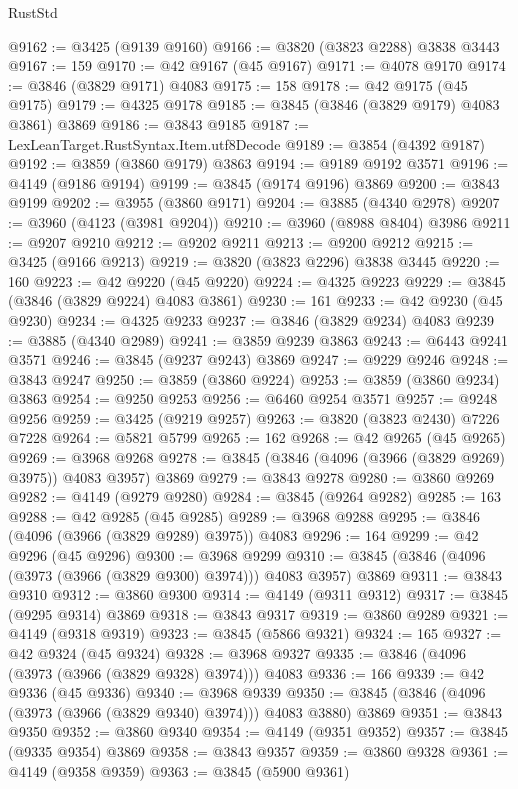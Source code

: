 \begin{lexlean}{RustStd}
\begin{coremodule}
@9162 := @3425 (@9139 @9160)
@9166 := @3820 (@3823 @2288) @3838 @3443
@9167 := 159
@9170 := @42 @9167 (@45 @9167)
@9171 := @4078 @9170
@9174 := @3846 (@3829 @9171) @4083
@9175 := 158
@9178 := @42 @9175 (@45 @9175)
@9179 := @4325 @9178
@9185 := @3845 (@3846 (@3829 @9179) @4083 @3861) @3869
@9186 := @3843 @9185
@9187 := LexLeanTarget.RustSyntax.Item.utf8Decode
@9189 := @3854 (@4392 @9187)
@9192 := @3859 (@3860 @9179) @3863
@9194 := @9189 @9192 @3571
@9196 := @4149 (@9186 @9194)
@9199 := @3845 (@9174 @9196) @3869
@9200 := @3843 @9199
@9202 := @3955 (@3860 @9171)
@9204 := @3885 (@4340 @2978)
@9207 := @3960 (@4123 (@3981 @9204))
@9210 := @3960 (@8988 @8404) @3986
@9211 := @9207 @9210
@9212 := @9202 @9211
@9213 := @9200 @9212
@9215 := @3425 (@9166 @9213)
@9219 := @3820 (@3823 @2296) @3838 @3445
@9220 := 160
@9223 := @42 @9220 (@45 @9220)
@9224 := @4325 @9223
@9229 := @3845 (@3846 (@3829 @9224) @4083 @3861)
@9230 := 161
@9233 := @42 @9230 (@45 @9230)
@9234 := @4325 @9233
@9237 := @3846 (@3829 @9234) @4083
@9239 := @3885 (@4340 @2989)
@9241 := @3859 @9239 @3863
@9243 := @6443 @9241 @3571
@9246 := @3845 (@9237 @9243) @3869
@9247 := @9229 @9246
@9248 := @3843 @9247
@9250 := @3859 (@3860 @9224)
@9253 := @3859 (@3860 @9234) @3863
@9254 := @9250 @9253
@9256 := @6460 @9254 @3571
@9257 := @9248 @9256
@9259 := @3425 (@9219 @9257)
@9263 := @3820 (@3823 @2430) @7226 @7228
@9264 := @5821 @5799
@9265 := 162
@9268 := @42 @9265 (@45 @9265)
@9269 := @3968 @9268
@9278 := @3845 (@3846 (@4096 (@3966 (@3829 @9269) @3975)) @4083 @3957) @3869
@9279 := @3843 @9278
@9280 := @3860 @9269
@9282 := @4149 (@9279 @9280)
@9284 := @3845 (@9264 @9282)
@9285 := 163
@9288 := @42 @9285 (@45 @9285)
@9289 := @3968 @9288
@9295 := @3846 (@4096 (@3966 (@3829 @9289) @3975)) @4083
@9296 := 164
@9299 := @42 @9296 (@45 @9296)
@9300 := @3968 @9299
@9310 := @3845 (@3846 (@4096 (@3973 (@3966 (@3829 @9300) @3974))) @4083 @3957) @3869
@9311 := @3843 @9310
@9312 := @3860 @9300
@9314 := @4149 (@9311 @9312)
@9317 := @3845 (@9295 @9314) @3869
@9318 := @3843 @9317
@9319 := @3860 @9289
@9321 := @4149 (@9318 @9319)
@9323 := @3845 (@5866 @9321)
@9324 := 165
@9327 := @42 @9324 (@45 @9324)
@9328 := @3968 @9327
@9335 := @3846 (@4096 (@3973 (@3966 (@3829 @9328) @3974))) @4083
@9336 := 166
@9339 := @42 @9336 (@45 @9336)
@9340 := @3968 @9339
@9350 := @3845 (@3846 (@4096 (@3973 (@3966 (@3829 @9340) @3974))) @4083 @3880) @3869
@9351 := @3843 @9350
@9352 := @3860 @9340
@9354 := @4149 (@9351 @9352)
@9357 := @3845 (@9335 @9354) @3869
@9358 := @3843 @9357
@9359 := @3860 @9328
@9361 := @4149 (@9358 @9359)
@9363 := @3845 (@5900 @9361)

\end{coremodule}
\end{lexlean}
